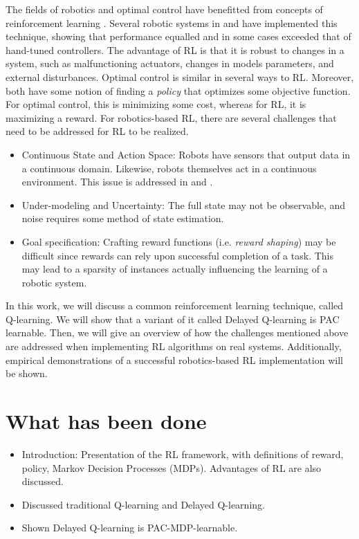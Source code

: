 \documentclass[10pt]{article}
\begin{document}
The fields of robotics and optimal control have benefitted from concepts of reinforcement learning \cite{kober_reinforcement_2013}\cite{kaelbling_reinforcement_1996}. Several robotic systems in  \cite{bhasin_reinforcement_2011} and \cite{hester_rtmba:_2012} have implemented this technique, showing that performance equalled and in some cases exceeded that of hand-tuned controllers. The advantage of RL is that it is robust to changes in a system, such as malfunctioning actuators, changes in models parameters, and external disturbances. Optimal control is similar in several ways to RL. Moreover, both have some notion of finding a \textit{policy} that optimizes some objective function. For optimal control, this is minimizing some cost, whereas for RL, it is maximizing a reward. For robotics-based RL, there are several challenges that need to be addressed for RL to be realized.
\begin{itemize}
\item Continuous State and Action Space: Robots have sensors that output data in a continuous domain.  Likewise, robots themselves act in a continuous environment. This issue is addressed in \cite{gaskett_thesis} and \cite{q_learning_navigation}.
\item Under-modeling and Uncertainty: The full state may not be observable, and noise requires some method of state estimation.
\item Goal specification: Crafting reward functions (i.e. \textit{reward shaping}) may be difficult since rewards can rely upon successful completion of a task. This may lead to a sparsity of instances actually influencing the learning of a robotic system.
\end{itemize}

In this work, we will discuss a common reinforcement learning technique, called Q-learning.  We will show that a variant of it called Delayed Q-learning is PAC learnable.  Then, we will give an overview of how the challenges mentioned above are addressed when implementing RL algorithms on real systems.  Additionally, empirical demonstrations of a successful robotics-based RL implementation will be shown. 



\section{What has been done}
\begin{itemize}
\item Introduction: Presentation of the RL framework, with definitions of reward, policy, Markov Decision Processes (MDPs). Advantages of RL are also discussed.
\item Discussed traditional Q-learning and Delayed Q-learning.
\item Shown Delayed Q-learning is PAC-MDP-learnable.
\end{itemize}
\end{document}
